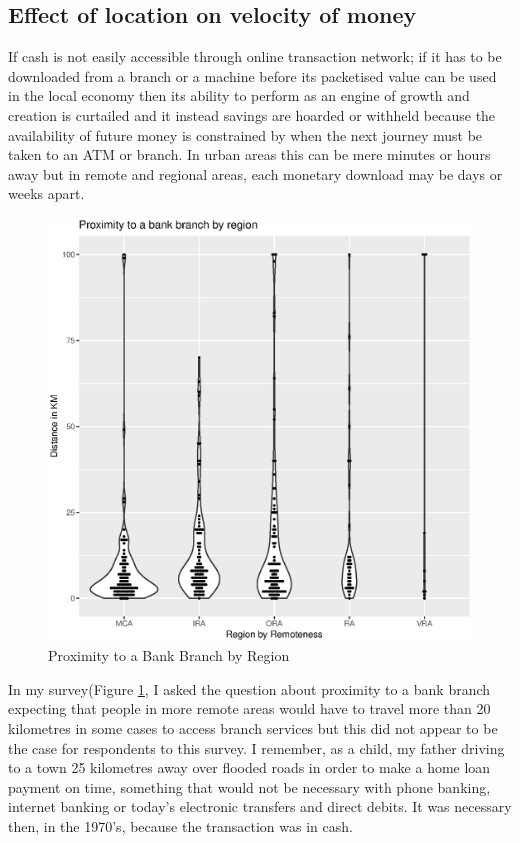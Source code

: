 \subsection{Effect of location on velocity of money}
If cash is not easily accessible through online transaction network; if it has to be downloaded from a branch or a machine before its packetised value can be used in the local economy then its ability to perform as an engine of growth and creation is curtailed and it instead savings are hoarded or withheld because the availability of future money is constrained by when the next journey must be taken to an ATM or branch. In urban areas this can be mere minutes or hours away but in remote and regional areas, each monetary download may be days or weeks apart.

\begin{figure}[ht]
\centering
\includegraphics[scale=0.5]{figures/VChart07-Proximity2BankBranch.eps} 
\caption{Proximity to a Bank Branch by Region} \label{fig:VC07BankProxRegions}
\end{figure}

In my survey(Figure \ref{fig:VC07BankProxRegions}, I asked the question about proximity to a bank branch expecting that people in more remote areas would have to travel more than 20 kilometres in some cases to access branch services but this did not appear to be the case for respondents to this survey. I remember, as a child, my father driving to a town 25 kilometres away over flooded roads in order to make a home loan payment on time, something that would not be necessary with phone banking, internet banking or today's electronic transfers and direct debits. It was necessary then, in the 1970's, because the transaction was in cash.

